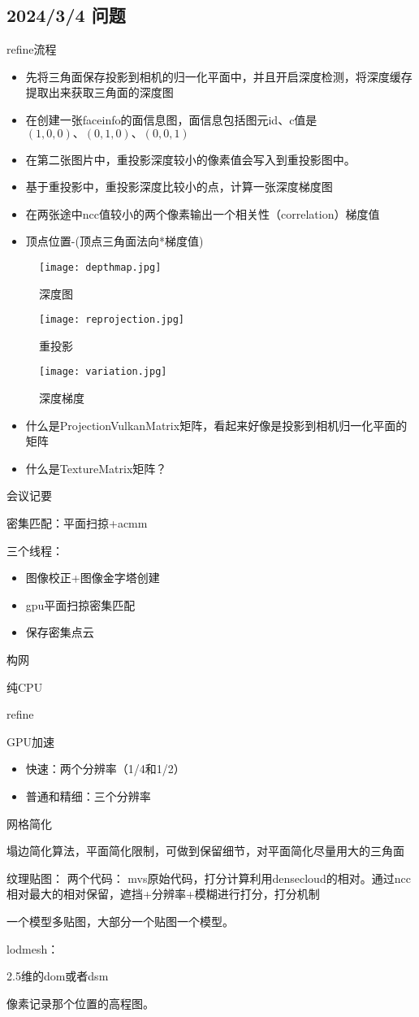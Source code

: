 \subsection{2024/3/4 问题}
refine流程
\begin{itemize}
	\item 先将三角面保存投影到相机的归一化平面中，并且开启深度检测，将深度缓存提取出来获取三角面的深度图
	\item 在创建一张faceinfo的面信息图，面信息包括图元id、c值是$(1,0,0)、(0,1,0)、(0,0,1)$
	\item 在第二张图片中，重投影深度较小的像素值会写入到重投影图中。
	\item 基于重投影中，重投影深度比较小的点，计算一张深度梯度图
	\item 在两张途中ncc值较小的两个像素输出一个相关性（correlation）梯度值
	\item 顶点位置-(顶点三角面法向*梯度值)
\end{itemize}

\begin{figure}[h]
    \centering
    \texttt{[image: depthmap.jpg]}
    \caption{深度图}
\end{figure}

\begin{figure}[h]
    \centering
    \texttt{[image: reprojection.jpg]}
    \caption{重投影}
\end{figure}

\begin{figure}[h]
    \centering
    \texttt{[image: variation.jpg]}
    \caption{深度梯度}
\end{figure}

\begin{itemize}
	\item 什么是ProjectionVulkanMatrix矩阵，看起来好像是投影到相机归一化平面的矩阵
	\item 什么是TextureMatrix矩阵？
\end{itemize}

会议记要

密集匹配：平面扫掠+acmm

三个线程：

\begin{itemize}
	\item 图像校正+图像金字塔创建
	\item gpu平面扫掠密集匹配
	\item 保存密集点云
\end{itemize}


构网

纯CPU

refine

GPU加速

\begin{itemize}
	\item 快速：两个分辨率（1/4和1/2）
	\item 普通和精细：三个分辨率
\end{itemize}

网格简化

塌边简化算法，平面简化限制，可做到保留细节，对平面简化尽量用大的三角面


纹理贴图：
两个代码：
mvs原始代码，打分计算利用densecloud的相对。通过ncc相对最大的相对保留，遮挡+分辨率+模糊进行打分，打分机制

一个模型多贴图，大部分一个贴图一个模型。

lodmesh：


2.5维的dom或者dsm


像素记录那个位置的高程图。